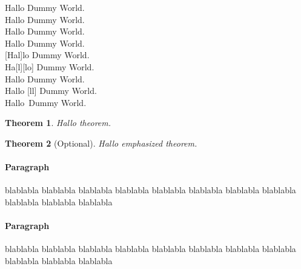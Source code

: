 \begin{lcHtmlBlock}
Hallo Dummy World.\\
%
\newenvironment{c}{Hallo}{World}
\begin{c} Dummy \end{c}.\\
%
\newenvironment{d}[1]{#1}{World}
\begin{d}{Hallo} Dummy \end{d}.\\
%
\newenvironment{e}[1]{#1}{World}
\newcommand{\begin@e@om}{#1#2}
\begin{e}{Hallo} Dummy \end{e}.\\
\begin{e}[Hal]{lo} Dummy \end{e}.\\
%
\newcommand{\begin@e@moo}{#1#2#3}
\begin{e}{Ha}[l][lo] Dummy \end{e}.\\
%
\newenvironment{ee}{Hallo }{World}
\newcommand{\begin@ee@o}{Ha#1o}
\begin{ee} Dummy \end{ee}.\\
\begin{ee}[ll] Dummy \end{ee}.\\
%
Hallo~Dummy World.

\newtheorem{mytheorem}{Theorem}

\begin{mytheorem}
    Hallo theorem.
\end{mytheorem}

\begin{mytheorem}[Optional]
    Hallo {\em emphasized\/} theorem.
\end{mytheorem}

\paragraph{Paragraph}

blablabla blablabla blablabla blablabla blablabla blablabla blablabla 
blablabla blablabla blablabla blablabla 

\paragraph*{Paragraph}

blablabla blablabla blablabla blablabla blablabla blablabla blablabla 
blablabla blablabla blablabla blablabla 


\end{lcHtmlBlock}
